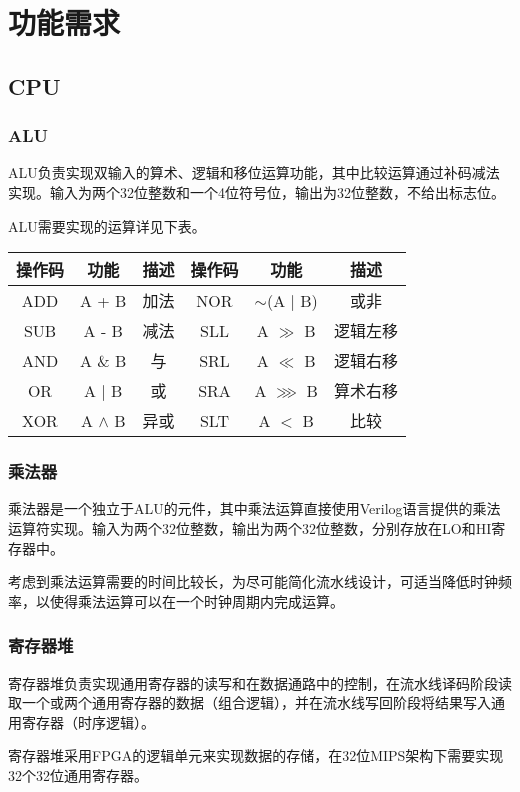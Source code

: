 \section{功能需求}
\subsection{CPU}
\subsubsection{ALU}
ALU负责实现双输入的算术、逻辑和移位运算功能，其中比较运算通过补码减法实现。输入为两个32位整数和一个4位符号位，输出为32位整数，不给出标志位。

ALU需要实现的运算详见下表。

\begin{table}[ht]
\centering
\begin{tabular}{cccccc}
\hline
操作码&功能&描述&操作码&功能&描述\\
\hline
ADD&A + B&加法&NOR&$\sim$(A $\mid$ B)&或非\\
SUB&A - B&减法&SLL&A $\gg$ B&逻辑左移\\
AND&A $\&$ B&与&SRL&A $\ll$ B&逻辑右移\\
OR&A $\mid$ B&或&SRA&A $\ggg$ B&算术右移\\
XOR&A $\wedge$ B&异或&SLT&A $<$ B&比较\\
\hline

\end{tabular}
\end{table}

\subsubsection{乘法器}
乘法器是一个独立于ALU的元件，其中乘法运算直接使用Verilog语言提供的乘法运算符实现。输入为两个32位整数，输出为两个32位整数，分别存放在LO和HI寄存器中。

考虑到乘法运算需要的时间比较长，为尽可能简化流水线设计，可适当降低时钟频率，以使得乘法运算可以在一个时钟周期内完成运算。

\subsubsection{寄存器堆}
寄存器堆负责实现通用寄存器的读写和在数据通路中的控制，在流水线译码阶段读取一个或两个通用寄存器的数据（组合逻辑），并在流水线写回阶段将结果写入通用寄存器（时序逻辑）。

寄存器堆采用FPGA的逻辑单元来实现数据的存储，在32位MIPS架构下需要实现32个32位通用寄存器。

